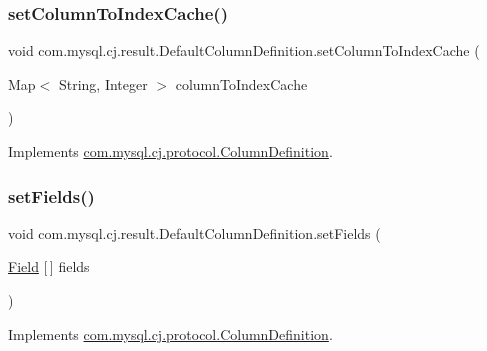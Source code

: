 \subsubsection{\texorpdfstring{set\+Column\+To\+Index\+Cache()}{setColumnToIndexCache()}}
{\footnotesize\ttfamily void com.\+mysql.\+cj.\+result.\+Default\+Column\+Definition.\+set\+Column\+To\+Index\+Cache (\begin{DoxyParamCaption}\item[{Map$<$ String, Integer $>$}]{column\+To\+Index\+Cache }\end{DoxyParamCaption})}



Implements \mbox{\hyperlink{interfacecom_1_1mysql_1_1cj_1_1protocol_1_1_column_definition_a1972ecc1b6610bbb394af09827c4643f}{com.\+mysql.\+cj.\+protocol.\+Column\+Definition}}.

\mbox{\label{classcom_1_1mysql_1_1cj_1_1result_1_1_default_column_definition_af37a2815b566bd95c2109c7649adf6f7}} 
\subsubsection{\texorpdfstring{set\+Fields()}{setFields()}}
{\footnotesize\ttfamily void com.\+mysql.\+cj.\+result.\+Default\+Column\+Definition.\+set\+Fields (\begin{DoxyParamCaption}\item[{\mbox{\hyperlink{classcom_1_1mysql_1_1cj_1_1result_1_1_field}{Field}} \mbox{[}$\,$\mbox{]}}]{fields }\end{DoxyParamCaption})}



Implements \mbox{\hyperlink{interfacecom_1_1mysql_1_1cj_1_1protocol_1_1_column_definition_a795612d44026e85eedca7443f4f47381}{com.\+mysql.\+cj.\+protocol.\+Column\+Definition}}.

\mbox{\label{classcom_1_1mysql_1_1cj_1_1result_1_1_default_column_definition_ae2045059ad696f24e150f350d78bf78f}} 
